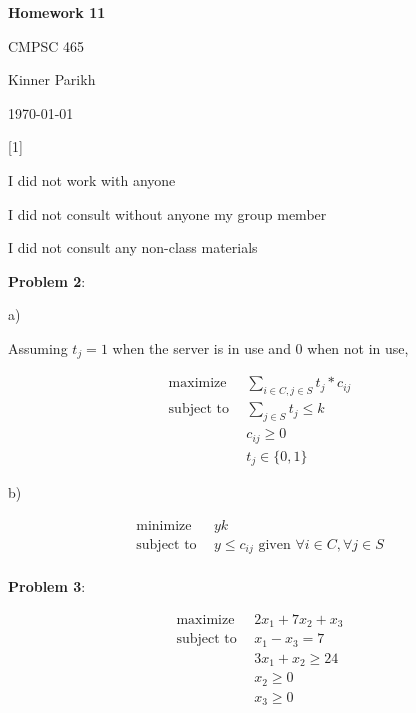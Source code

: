 \documentclass{article} %
\newcommand{\question}[2][]{\begin{flushleft}
        \textbf{Problem #1}: \textit{#2}

\end{flushleft}}
\newcommand{\maketitletwo}[2][]{\begin{center}
        \Large{\textbf{Homework #1}
            
            CMPSC 465} %
        \vspace{5pt}
        
        \normalsize{Kinner Parikh  %
        
        \today}        %
        \vspace{40pt}


        \newpage
        
\end{center}}
\begin{document}
    \maketitletwo[11]  %

    \question[1]{}
    \begin{center}
        
        I did not work with anyone
    
        I did not consult without anyone my group member
    
        I did not consult any non-class materials
    \end{center}
    
    \newpage

    \question[2]{}

    a)

    Assuming $t_j = 1$ when the server is in use and 0 when not in use,

    \begin{align*}
        \text{maximize} \ \ &\sum_{i \in C, j \in S} t_j * c_{ij} \\
        \text{subject to} \ \ &\sum_{j \in S} t_j \leq k \\
        &c_{ij} \geq 0\\
        &t_j \in \{0, 1\}
    \end{align*}

    b)

    \begin{align*}
        \text{minimize} \ \ &yk \\
        \text{subject to} \ \ &y \leq c_{ij}\text{ given } \forall i \in C, \forall j \in S\\
    \end{align*}
    
    \newpage

    \question[3]{}
    
    \begin{align*}
        \text{maximize} \ \ &2x_1+7x_2+x_3 \\
        \text{subject to} \ \ &x_1-x_3=7 \\
        &3x_1+x_2 \geq 24 \\
        &x_2 \geq 0 \\
        &x_3 \geq 0
    \end{align*}
\end{document}
